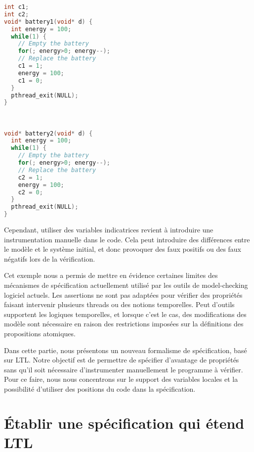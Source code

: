 \noindent\begin{minipage}{.45\textwidth}
\begin{lstlisting}[language=C, frame=single, caption=Thread 1]
int c1;
int c2;
void* battery1(void* d) {
  int energy = 100;
  while(1) {
    // Empty the battery
    for(; energy>0; energy--);
    // Replace the battery
    c1 = 1;
    energy = 100;
    c1 = 0;
  }
  pthread_exit(NULL);
}
\end{lstlisting}
\end{minipage}\hfill
\begin{minipage}{.45\textwidth}
\begin{lstlisting}[language=C, frame=single, caption=Thread 1]


void* battery2(void* d) {
  int energy = 100;
  while(1) {
    // Empty the battery
    for(; energy>0; energy--);
    // Replace the battery
    c2 = 1;
    energy = 100;
    c2 = 0;
  }
  pthread_exit(NULL);
}
\end{lstlisting}
\end{minipage}

Cependant, utiliser des variables indicatrices revient à introduire une
instrumentation manuelle dans le code. Cela peut introduire des
différences entre le modèle et le système initial, et donc provoquer des
faux positifs ou des faux négatifs lors de la vérification.

Cet exemple nous a permis de mettre en évidence certaines limites des mécanismes
de spécification actuellement utilisé par les outils de model-checking logiciel
actuels. Les assertions ne sont pas adaptées pour vérifier des propriétés
faisant intervenir plusieurs threads ou des notions temporelles. Peut d'outils
supportent les logiques temporelles, et lorsque c'est le cas, des modifications
des modèle sont nécessaire en raison des restrictions imposées sur la
définitions des propositions atomiques.

Dans cette partie, nous présentons un nouveau formalisme de spécification, basé
sur LTL. Notre objectif est de permettre de spécifier d'avantage de propriétés
sans qu'il soit nécessaire d'instrumenter manuellement le programme à vérifier.
Pour ce faire, nous nous concentrons sur le support des variables locales et la
possibilité d'utiliser des positions du code dans la spécification.

\section{Établir une spécification qui étend LTL}

